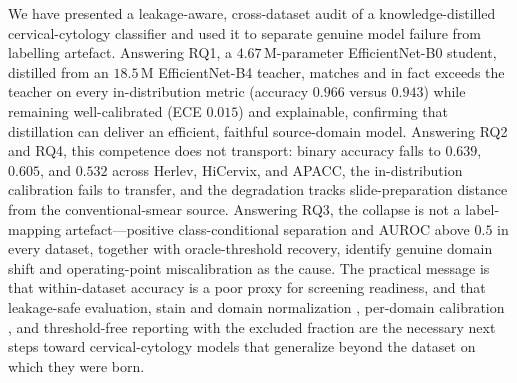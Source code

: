 We have presented a leakage-aware, cross-dataset audit of a knowledge-distilled cervical-cytology classifier and used it to separate genuine model failure from labelling artefact. Answering RQ1, a $4.67$\,M-parameter EfficientNet-B0 student, distilled from an $18.5$\,M EfficientNet-B4 teacher, matches and in fact exceeds the teacher on every in-distribution metric (accuracy $0.966$ versus $0.943$) while remaining well-calibrated (ECE $0.015$) and explainable, confirming that distillation can deliver an efficient, faithful source-domain model. Answering RQ2 and RQ4, this competence does not transport: binary accuracy falls to $0.639$, $0.605$, and $0.532$ across Herlev, HiCervix, and APACC, the in-distribution calibration fails to transfer, and the degradation tracks slide-preparation distance from the conventional-smear source. Answering RQ3, the collapse is not a label-mapping artefact---positive class-conditional separation and AUROC above $0.5$ in every dataset, together with oracle-threshold recovery, identify genuine domain shift and operating-point miscalibration as the cause. The practical message is that within-dataset accuracy is a poor proxy for screening readiness, and that leakage-safe evaluation, stain and domain normalization \citep{macenko2009stain}, per-domain calibration \citep{guo2017calibration}, and threshold-free reporting with the excluded fraction are the necessary next steps toward cervical-cytology models that generalize beyond the dataset on which they were born.